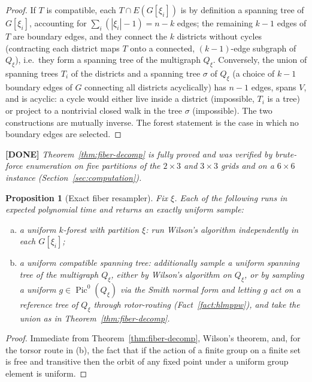 \documentclass[11pt]{article}
\newcommand{\done}[1]{\medskip\noindent\textcolor{donecol}{\textbf{[DONE]} \emph{#1}}\medskip}
\newcommand{\PicO}[1]{\operatorname{Pic}^0(#1)}
\newtheorem{proposition}[theorem]{Proposition}
\begin{document}
\begin{proof}
If $T$ is compatible, each $T \cap E(G[\xi_i])$ is by definition a spanning
tree of $G[\xi_i]$, accounting for $\sum_i (|\xi_i| - 1) = n - k$ edges; the
remaining $k - 1$ edges of $T$ are boundary edges, and they connect the $k$
districts without cycles (contracting each district maps $T$ onto a
connected, $(k-1)$-edge subgraph of $Q_\xi$), i.e.\ they form a spanning
tree of the multigraph $Q_\xi$. Conversely, the union of spanning trees
$T_i$ of the districts and a spanning tree $\sigma$ of $Q_\xi$ (a choice of
$k-1$ boundary edges of $G$ connecting all districts acyclically) has
$n - 1$ edges, spans $V$, and is acyclic: a cycle would either live inside a
district (impossible, $T_i$ is a tree) or project to a nontrivial closed
walk in the tree $\sigma$ (impossible). The two constructions are mutually
inverse. The forest statement is the case in which no boundary edges are
selected.
\end{proof}

\done{Theorem~\ref{thm:fiber-decomp} is fully proved and was verified by
brute-force enumeration on five partitions of the $2\times 3$ and
$3 \times 3$ grids and on a $6 \times 6$ instance
(Section~\ref{sec:computation}).}

\begin{proposition}[Exact fiber resampler]
\label{prop:resampler}
Fix $\xi$. Each of the following runs in expected polynomial time and
returns an exactly uniform sample:
\begin{enumerate}[(a)]
  \item a uniform $k$-forest with partition $\xi$: run Wilson's algorithm
    independently in each $G[\xi_i]$;
  \item a uniform compatible spanning tree: additionally sample a uniform
    spanning tree of the multigraph $Q_\xi$, either by Wilson's algorithm
    on $Q_\xi$, or by sampling a uniform $g \in \PicO{Q_\xi}$ via the Smith
    normal form and letting $g$ act on a reference tree of $Q_\xi$ through
    rotor-routing (Fact~\ref{fact:hlmppw}), and take the union as in
    Theorem~\ref{thm:fiber-decomp}.
\end{enumerate}
\end{proposition}

\begin{proof}
Immediate from Theorem~\ref{thm:fiber-decomp}, Wilson's theorem, and, for
the torsor route in (b), the fact that if the action of a finite group on a
finite set is free and transitive then the orbit of any fixed point under a
uniform group element is uniform.
\end{proof}
\end{document}
